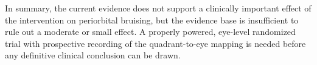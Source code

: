 
In summary, the current evidence does not support a clinically important effect of the intervention on periorbital bruising, but the evidence base is insufficient to rule out a moderate or small effect. A properly powered, eye-level randomized trial with prospective recording of the quadrant-to-eye mapping is needed before any definitive clinical conclusion can be drawn.
